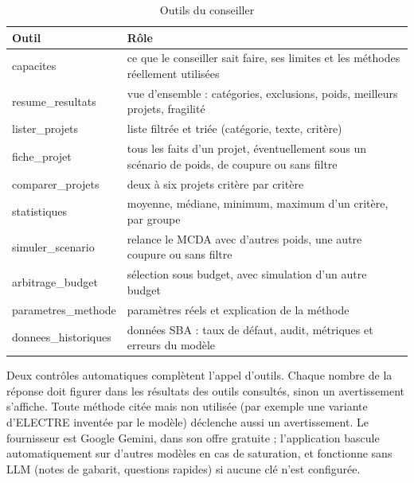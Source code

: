 \begin{table}[htbp]
\centering\footnotesize
\caption{Outils du conseiller}\label{tab:outils}
\begin{tabularx}{\textwidth}{>{\ttfamily}p{3.6cm}X}
\toprule
\normalfont Outil & Rôle \\
\midrule
capacites & ce que le conseiller sait faire, ses limites et les méthodes réellement utilisées \\
resume\_resultats & vue d'ensemble : catégories, exclusions, poids, meilleurs projets, fragilité \\
lister\_projets & liste filtrée et triée (catégorie, texte, critère) \\
fiche\_projet & tous les faits d'un projet, éventuellement sous un scénario de poids, de coupure ou sans filtre \\
comparer\_projets & deux à six projets critère par critère \\
statistiques & moyenne, médiane, minimum, maximum d'un critère, par groupe \\
simuler\_scenario & relance le MCDA avec d'autres poids, une autre coupure ou sans filtre \\
arbitrage\_budget & sélection sous budget, avec simulation d'un autre budget \\
parametres\_methode & paramètres réels et explication de la méthode \\
donnees\_historiques & données SBA : taux de défaut, audit, métriques et erreurs du modèle \\
\bottomrule
\end{tabularx}
\end{table}

Deux contrôles automatiques complètent l'appel d'outils. Chaque nombre de la réponse doit figurer dans les résultats
des outils consultés, sinon un avertissement s'affiche. Toute méthode citée mais non utilisée (par exemple une variante
d'ELECTRE inventée par le modèle) déclenche aussi un avertissement. Le fournisseur est Google Gemini, dans son offre
gratuite ; l'application bascule automatiquement sur d'autres modèles en cas de saturation, et fonctionne sans LLM
(notes de gabarit, questions rapides) si aucune clé n'est configurée.

